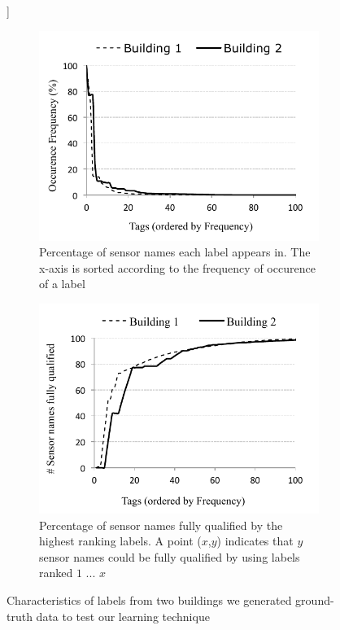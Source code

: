 \begin{figure}[h!]]
\centering
	\begin{subfigure}{0.48\textwidth}
                \centering
		\includegraphics[width=\textwidth]{./figs/pointOccuranceFreq.pdf}
                \caption{Percentage of sensor names each label appears in. The x-axis is sorted according to the frequency of occurence of a label}
                \label{fig:labelFreq}
	\end{subfigure}
	\begin{subfigure}{0.48\textwidth}
                \centering
		\includegraphics[width=\textwidth]{./figs/pointCDF.pdf}
                \caption{Percentage of sensor names fully qualified by the highest ranking labels. A point ($x$,$y$) indicates that $y$ sensor names could be fully qualified by using labels ranked $1$ ... $x$}
                \label{fig:pointCDF}
	\end{subfigure}
\caption{Characteristics of labels from two buildings we generated ground-truth data to test our learning technique}
\label{fig:buildingLabelCharacteristics}
\end{figure}


